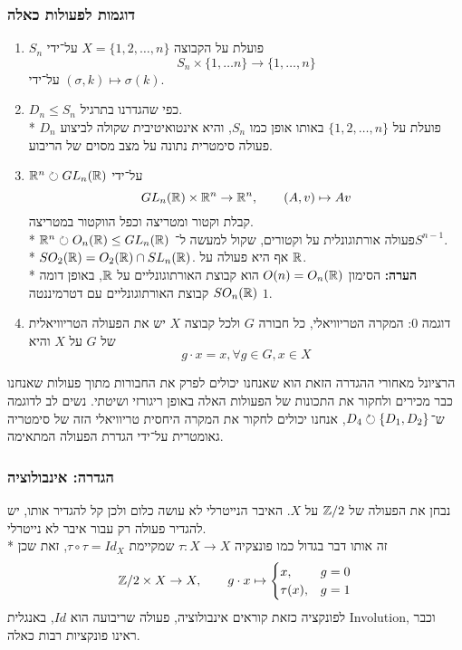 \subsubsection{דוגמות לפעולות כאלה}
\begin{enumerate}
	\item $S_n$ פועלת על הקבוצה $X = \{1, 2, \hdots, n\}$ על־ידי
		\[
			S_n \times \{1, \hdots n\} \to \{1, \hdots, n\}
		\]
		על־ידי $(\sigma, k) \mapsto \sigma(k)$.
	\item $D_n \le S_n$ כפי שהגדרנו בתרגיל. \\*
		$D_n$ פועלת על $\{1, 2, \hdots, n \}$ באותו אופן כמו $S_n$, והיא אינטואיטיבית שקולה לביצוע פעולה סימטרית נתונה על מצב מסוים של הריבוע.
	\item $\mathbb{R}^n \circlearrowright GL_n(\mathbb{R})$ על־ידי
		\[
			GL_n(\mathbb{R}) \times \mathbb{R}^n \to \mathbb{R}^n, \qquad (A, v) \mapsto Av
		\]
		קבלת וקטור ומטריצה וכפל הווקטור במטריצה. \\*
		$\mathbb{R}^n \circlearrowright O_n(\mathbb{R}) \le GL_n(\mathbb{R})$ פעולה אורתוגונלית על וקטורים, שקול למעשה ל־$S^{n - 1}$. \\*
		$SO_2(\mathbb{R}) = O_2(\mathbb{R}) \cap SL_n(\mathbb{R})$. אף היא פעולה על $\mathbb{R}$. \\*
		\textbf{הערה:} הסימון $O(n) = O_n(\mathbb{R})$ הוא קבוצת האורתוגונליים על $\mathbb{R}$, באופן דומה $SO_n(\mathbb{R})$ קבוצת האורתוגונליים עם דטרמיננטה $1$.
	\item דוגמה 0: המקרה הטריוויאלי, כל חבורה $G$ ולכל קבוצה $X$ יש את הפעולה הטריוויאלית של $G$ על $X$ והיא
		\[
			g \cdot x = x, \forall g \in G, x \in X
		\]
\end{enumerate}

הרציונל מאחורי ההגדרה הזאת הוא שאנחנו יכולים לפרק את החבורות מתוך פעולות שאנחנו כבר מכירים ולחקור את התכונות של הפעולות האלה באופן ריגורזי ושיטתי.
נשים לב לדוגמה ש־$D_4 \circlearrowright \{ D_1, D_2 \}$, אנחנו יכולים לחקור את המקרה היחסית טריוויאלי הזה של סימטריה גאומטרית על־ידי הגדרת הפעולה המתאימה.

\subsubsection{הגדרה: אינבולוציה}
נבחן את הפעולה של $\mathbb{Z}/2$ על $X$. האיבר הנייטרלי לא עושה כלום ולכן קל להגדיר אותו, יש להגדיר פעולה רק עבור איבר לא נייטרלי. \\*
זה אותו דבר בגדול כמו פונצקיה $\tau : X \to X$ שמקיימת $\tau \circ \tau = Id_X$, זאת שכן
\[
	\mathbb{Z}/2 \times X \to X, \qquad g \cdot x \mapsto \begin{cases}
		x, & g = 0 \\
		\tau(x), & g = 1
	\end{cases}
\]
לפונקציה כזאת קוראים אינבולוציה, פעולה שריבועה הוא $Id$, באנגלית Involution, וכבר ראינו פונקציות רבות כאלה.

